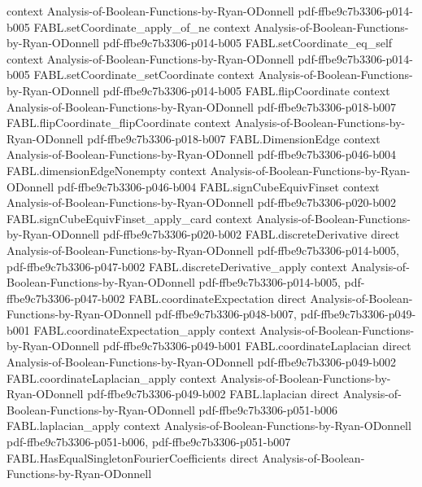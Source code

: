 \begin{theorem}
  {context}
  {Analysis-of-Boolean-Functions-by-Ryan-ODonnell}
  {pdf-ffbe9c7b3306-p014-b005}
\proofstep
  {FABL.setCoordinate_apply_of_ne}
  {context}
  {Analysis-of-Boolean-Functions-by-Ryan-ODonnell}
  {pdf-ffbe9c7b3306-p014-b005}
\proofstep
  {FABL.setCoordinate_eq_self}
  {context}
  {Analysis-of-Boolean-Functions-by-Ryan-ODonnell}
  {pdf-ffbe9c7b3306-p014-b005}
\proofstep
  {FABL.setCoordinate_setCoordinate}
  {context}
  {Analysis-of-Boolean-Functions-by-Ryan-ODonnell}
  {pdf-ffbe9c7b3306-p014-b005}
\proofstep
  {FABL.flipCoordinate}
  {context}
  {Analysis-of-Boolean-Functions-by-Ryan-ODonnell}
  {pdf-ffbe9c7b3306-p018-b007}
\proofstep
  {FABL.flipCoordinate_flipCoordinate}
  {context}
  {Analysis-of-Boolean-Functions-by-Ryan-ODonnell}
  {pdf-ffbe9c7b3306-p018-b007}
\proofstep
  {FABL.DimensionEdge}
  {context}
  {Analysis-of-Boolean-Functions-by-Ryan-ODonnell}
  {pdf-ffbe9c7b3306-p046-b004}
\proofstep
  {FABL.dimensionEdgeNonempty}
  {context}
  {Analysis-of-Boolean-Functions-by-Ryan-ODonnell}
  {pdf-ffbe9c7b3306-p046-b004}
\proofstep
  {FABL.signCubeEquivFinset}
  {context}
  {Analysis-of-Boolean-Functions-by-Ryan-ODonnell}
  {pdf-ffbe9c7b3306-p020-b002}
\proofstep
  {FABL.signCubeEquivFinset_apply_card}
  {context}
  {Analysis-of-Boolean-Functions-by-Ryan-ODonnell}
  {pdf-ffbe9c7b3306-p020-b002}
\proofstep
  {FABL.discreteDerivative}
  {direct}
  {Analysis-of-Boolean-Functions-by-Ryan-ODonnell}
  {pdf-ffbe9c7b3306-p014-b005,
    pdf-ffbe9c7b3306-p047-b002}
\proofstep
  {FABL.discreteDerivative_apply}
  {context}
  {Analysis-of-Boolean-Functions-by-Ryan-ODonnell}
  {pdf-ffbe9c7b3306-p014-b005,
    pdf-ffbe9c7b3306-p047-b002}
\proofstep
  {FABL.coordinateExpectation}
  {direct}
  {Analysis-of-Boolean-Functions-by-Ryan-ODonnell}
  {pdf-ffbe9c7b3306-p048-b007,
    pdf-ffbe9c7b3306-p049-b001}
\proofstep
  {FABL.coordinateExpectation_apply}
  {context}
  {Analysis-of-Boolean-Functions-by-Ryan-ODonnell}
  {pdf-ffbe9c7b3306-p049-b001}
\proofstep
  {FABL.coordinateLaplacian}
  {direct}
  {Analysis-of-Boolean-Functions-by-Ryan-ODonnell}
  {pdf-ffbe9c7b3306-p049-b002}
\proofstep
  {FABL.coordinateLaplacian_apply}
  {context}
  {Analysis-of-Boolean-Functions-by-Ryan-ODonnell}
  {pdf-ffbe9c7b3306-p049-b002}
\proofstep
  {FABL.laplacian}
  {direct}
  {Analysis-of-Boolean-Functions-by-Ryan-ODonnell}
  {pdf-ffbe9c7b3306-p051-b006}
\proofstep
  {FABL.laplacian_apply}
  {context}
  {Analysis-of-Boolean-Functions-by-Ryan-ODonnell}
  {pdf-ffbe9c7b3306-p051-b006,
    pdf-ffbe9c7b3306-p051-b007}
\proofstep
  {FABL.HasEqualSingletonFourierCoefficients}
  {direct}
  {Analysis-of-Boolean-Functions-by-Ryan-ODonnell}

\end{theorem}
